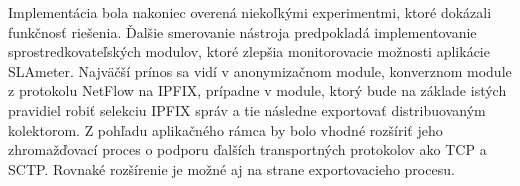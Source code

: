 Implementácia bola nakoniec overená niekoľkými experimentmi, ktoré dokázali funkčnosť riešenia. Ďalšie 
smerovanie nástroja predpokladá implementovanie sprostredkovateľských modulov, ktoré zlepšia monitorovacie 
možnosti aplikácie SLAmeter. Najväčší prínos sa vidí v anonymizačnom module, konverznom module z protokolu 
NetFlow na IPFIX, prípadne v module, ktorý
bude na základe istých pravidiel robiť selekciu IPFIX správ a tie následne exportovať distribuovaným 
kolektorom. Z pohľadu aplikačného rámca by bolo vhodné rozšíriť jeho zhromažďovací proces o podporu 
ďalších transportných protokolov ako TCP a SCTP. Rovnaké rozšírenie je možné aj na strane exportovacieho 
procesu.


